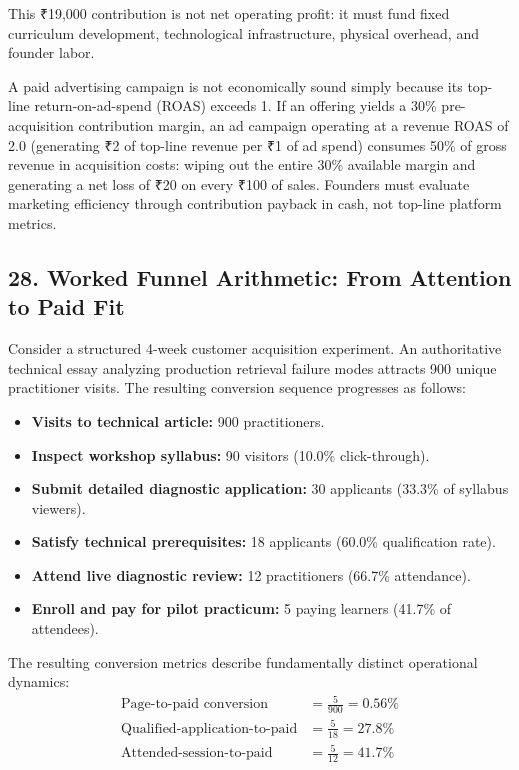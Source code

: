 This ₹19,000 contribution is not net operating profit: it must fund fixed curriculum development, technological infrastructure, physical overhead, and founder labor. 

A paid advertising campaign is not economically sound simply because its top-line return-on-ad-spend (ROAS) exceeds 1. If an offering yields a 30\% pre-acquisition contribution margin, an ad campaign operating at a revenue ROAS of 2.0 (generating ₹2 of top-line revenue per ₹1 of ad spend) consumes 50\% of gross revenue in acquisition costs: wiping out the entire 30\% available margin and generating a net loss of ₹20 on every ₹100 of sales. Founders must evaluate marketing efficiency through contribution payback in cash, not top-line platform metrics.

\subsection*{28. Worked Funnel Arithmetic: From Attention to Paid Fit}

Consider a structured 4-week customer acquisition experiment. An authoritative technical essay analyzing production retrieval failure modes attracts 900 unique practitioner visits. The resulting conversion sequence progresses as follows:
\begin{itemize}[leftmargin=*,itemsep=1pt]
  \item \textbf{Visits to technical article:} 900 practitioners.
  \item \textbf{Inspect workshop syllabus:} 90 visitors (10.0\% click-through).
  \item \textbf{Submit detailed diagnostic application:} 30 applicants (33.3\% of syllabus viewers).
  \item \textbf{Satisfy technical prerequisites:} 18 applicants (60.0\% qualification rate).
  \item \textbf{Attend live diagnostic review:} 12 practitioners (66.7\% attendance).
  \item \textbf{Enroll and pay for pilot practicum:} 5 paying learners (41.7\% of attendees).
\end{itemize}

The resulting conversion metrics describe fundamentally distinct operational dynamics:
\begin{align*}
  \text{Page-to-paid conversion} &= \frac{5}{900} = 0.56\% \\
  \text{Qualified-application-to-paid} &= \frac{5}{18} = 27.8\% \\
  \text{Attended-session-to-paid} &= \frac{5}{12} = 41.7\%
\end{align*}

